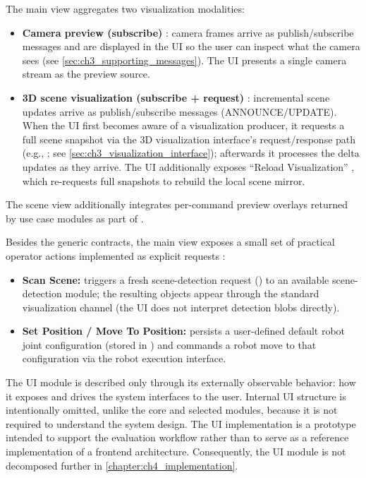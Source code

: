 The main view aggregates two visualization modalities:
\begin{itemize}
    \item \textbf{Camera preview (subscribe)} : camera frames arrive as publish/subscribe messages and are displayed in the UI so the user can inspect what the camera sees (see \autoref{sec:ch3_supporting_messages}). The UI presents a single camera stream as the preview source.
    \item \textbf{3D scene visualization (subscribe + request)} : incremental scene updates arrive as publish/subscribe messages (ANNOUNCE/UPDATE). When the UI first becomes aware of a visualization producer, it requests a full scene snapshot via the 3D visualization interface's request/response path (e.g., ; see \autoref{sec:ch3_visualization_interface}); afterwards it processes the delta updates as they arrive. The UI additionally exposes ``Reload Visualization'' , which re-requests full snapshots to rebuild the local scene mirror.
\end{itemize}
The scene view additionally integrates per-command preview overlays returned by use case modules as part of .

Besides the generic contracts, the main view exposes a small set of practical operator actions implemented as explicit requests :
\begin{itemize}
    \item \textbf{Scan Scene:} triggers a fresh scene-detection request () to an available scene-detection module; the resulting objects appear through the standard visualization channel (the UI does not interpret detection blobs directly).
    \item \textbf{Set Position / Move To Position:} persists a user-defined default robot joint configuration (stored in ) and commands a robot move to that configuration via the robot execution interface.
\end{itemize}

The UI module is described only through its externally observable behavior: how it exposes and drives the system interfaces to the user. Internal UI structure is intentionally omitted, unlike the core and selected modules, because it is not required to understand the system design. The UI implementation is a prototype intended to support the evaluation workflow rather than to serve as a reference implementation of a frontend architecture. Consequently, the UI module is not decomposed further in \autoref{chapter:ch4_implementation}.


